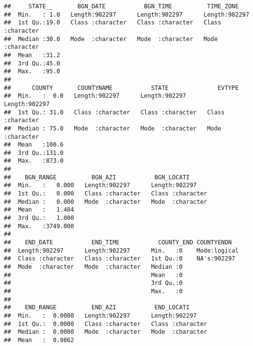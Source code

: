 \documentclass[]{article}
\begin{document}
\begin{verbatim}
##     STATE__       BGN_DATE           BGN_TIME          TIME_ZONE        
##  Min.   : 1.0   Length:902297      Length:902297      Length:902297     
##  1st Qu.:19.0   Class :character   Class :character   Class :character  
##  Median :30.0   Mode  :character   Mode  :character   Mode  :character  
##  Mean   :31.2                                                           
##  3rd Qu.:45.0                                                           
##  Max.   :95.0                                                           
##                                                                         
##      COUNTY       COUNTYNAME           STATE              EVTYPE         
##  Min.   :  0.0   Length:902297      Length:902297      Length:902297     
##  1st Qu.: 31.0   Class :character   Class :character   Class :character  
##  Median : 75.0   Mode  :character   Mode  :character   Mode  :character  
##  Mean   :100.6                                                           
##  3rd Qu.:131.0                                                           
##  Max.   :873.0                                                           
##                                                                          
##    BGN_RANGE          BGN_AZI           BGN_LOCATI       
##  Min.   :   0.000   Length:902297      Length:902297     
##  1st Qu.:   0.000   Class :character   Class :character  
##  Median :   0.000   Mode  :character   Mode  :character  
##  Mean   :   1.484                                        
##  3rd Qu.:   1.000                                        
##  Max.   :3749.000                                        
##                                                          
##    END_DATE           END_TIME           COUNTY_END COUNTYENDN    
##  Length:902297      Length:902297      Min.   :0    Mode:logical  
##  Class :character   Class :character   1st Qu.:0    NA's:902297   
##  Mode  :character   Mode  :character   Median :0                  
##                                        Mean   :0                  
##                                        3rd Qu.:0                  
##                                        Max.   :0                  
##                                                                   
##    END_RANGE          END_AZI           END_LOCATI       
##  Min.   :  0.0000   Length:902297      Length:902297     
##  1st Qu.:  0.0000   Class :character   Class :character  
##  Median :  0.0000   Mode  :character   Mode  :character  
##  Mean   :  0.9862                                        

\end{verbatim}
\end{document}
